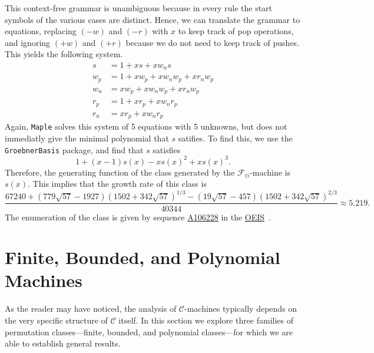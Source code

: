 \documentclass[10pt]{article}
\theoremstyle{plain}
\theoremstyle{definition}
\newcommand{\C}{\mathcal{C}}
\newcommand{\F}{\mathcal{F}}
\newcommand{\OEISlink}[1]{\href{http://oeis.org/#1}{#1}}
\newcommand{\OEISref}{\href{http://oeis.org/}{OEIS}~\cite{sloane:the-on-line-enc:}}
\newcommand{\OEIS}[1]{sequence \OEISlink{#1} in the \OEISref}
\begin{document}
This context-free grammar is unambiguous because in every rule the start symbols of the various cases are distinct. Hence, we can translate the grammar to equations, replacing $(-w)$ and $(-r)$  with $x$ to keep track of pop operations, and ignoring $(+w)$ and $(+r)$ because we do not need to keep track of pushes. This yields the following system.
\begin{align*}
	s &= 1 + xs + xw_ns\\
	w_p &= 1 + xw_p + xw_nw_p + xr_nw_p\\
	w_n &= xw_p + xw_nw_p + xr_nw_p\\
	r_p &= 1 + xr_p + xw_nr_p\\
	r_n &= xr_p + xw_nr_p
\end{align*}
Again, \texttt{Maple} solves this system of 5 equations with 5 unknowns, but does not immediatly give the minimal polynomial that $s$ satifies. To find this, we use the \texttt{GroebnerBasis} package, and find that $s$ satisfies 
\[
	1 + (x-1)s(x) - xs(x)^2 + xs(x)^3.
\]
Therefore, the generating function of the class generated by the $\F_\ominus$-machine is $s(x)$. This implies that the growth rate of this class is
\[
	\frac{67240 + (779\sqrt{57}-1927)(1502 + 342\sqrt{57})^{1/3} - (19\sqrt{57} - 457)(1502 + 342\sqrt{57})^{2/3}}{40344} \approx 5.219.
\]
The enumeration of the class is given by \OEIS{A106228}.

%

\section{Finite, Bounded, and Polynomial Machines}
\label{sec-finite-bounded}

As the reader may have noticed, the analysis of $\C$-machines typically depends on the very specific structure of $\C$ itself. In this section we explore three families of permutation classes---finite, bounded, and polynomial classes---for which we are able to establish general results.
\end{document}
